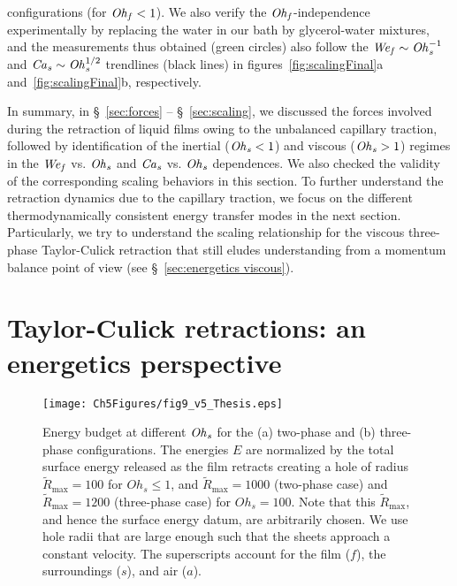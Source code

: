 configurations (for $\mathit{Oh}_\mathit{f} < 1$). We also verify the $\mathit{Oh}_\mathit{f}$-independence experimentally by replacing the water in our bath by glycerol-water mixtures, and the measurements thus obtained (green circles) also follow the $\mathit{We}_\mathit{f} \sim \mathit{Oh}_\mathit{s}^{-1}$ and $\mathit{Ca}_\mathit{s} \sim \mathit{Oh}_\mathit{s}^{1/2}$ trendlines (black lines) in figures~\ref{fig:scalingFinal}a and~\ref{fig:scalingFinal}b, respectively.  

In summary, in \S~\ref{sec:forces} -- \S~\ref{sec:scaling}, we discussed the forces involved during the retraction of liquid films owing to the unbalanced capillary traction, followed by identification of the inertial ($\mathit{Oh}_\mathit{s} < 1$) and viscous ($\mathit{Oh}_\mathit{s} > 1$) regimes in the $\mathit{We}_\mathit{f}$ vs. $\mathit{Oh}_\mathit{s}$ and $\mathit{Ca}_\mathit{s}$ vs. $\mathit{Oh}_\mathit{s}$ dependences. We also checked the validity of the corresponding scaling behaviors in this section. To further understand the retraction dynamics due to the capillary traction, we focus on the different thermodynamically consistent energy transfer modes in the next section. Particularly, we try to understand the scaling relationship for the viscous three-phase Taylor-Culick retraction that still eludes understanding from a momentum balance point of view (see \S~\ref{sec:energetics viscous}). 

\section{Taylor-Culick retractions: an energetics perspective} 
\label{sec:energetics}
\begin{figure}
	\centering
	\texttt{[image: Ch5Figures/fig9\_v5\_Thesis.eps]}
	\caption{Energy budget at different $\mathit{Oh}_\mathit{s}$ for the (a) two-phase and (b) three-phase configurations. The energies $E$ are normalized by the total surface energy released as the film retracts creating a hole of radius $\tilde{R}_{\text{max}} = 100$ for $Oh_s \le 1$, and $\tilde{R}_{\text{max}} = 1000$ (two-phase case) and $\tilde{R}_{\text{max}} = 1200$ (three-phase case) for $Oh_s = 100$. Note that this $\tilde{R}_{\text{max}}$, and hence the surface energy datum, are arbitrarily chosen. We use hole radii that are large enough such that the sheets approach a constant velocity. The superscripts account for the film ($f$), the surroundings ($s$), and air ($a$). }
	\label{fig:energy}
\end{figure}

